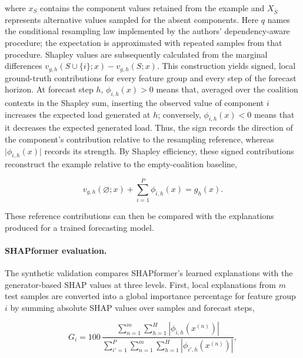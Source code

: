 where $x_S$ contains the component values retained from the example and
$X_{\bar S}$ represents alternative values sampled for the absent components.
Here $q$ names the conditional resampling law implemented by the authors'
dependency-aware procedure; the expectation is approximated with repeated
samples from that procedure.
Shapley values are subsequently calculated from the marginal differences
$v_{g,h}(S\cup\{i\};x)-v_{g,h}(S;x)$. This construction yields signed, local
ground-truth contributions for every feature group and every step of the
forecast horizon. At forecast step $h$, $\phi_{i,h}(x)>0$ means that, averaged
over the coalition contexts in the Shapley sum, inserting the observed value
of component $i$ increases the expected load generated at $h$; conversely,
$\phi_{i,h}(x)<0$ means that it decreases the expected generated load. Thus, the
sign records the direction of the component's contribution relative to the
resampling reference, whereas $\lvert\phi_{i,h}(x)\rvert$ records its strength.
By Shapley efficiency, these signed contributions reconstruct the example
relative to the empty-coalition baseline,

\begin{equation}
    v_{g,h}(\varnothing;x)
    + \sum_{i=1}^{P}\phi_{i,h}(x)
    = g_h(x).
\end{equation}

These reference contributions can then be compared with the explanations
produced for a trained forecasting model.

\paragraph{SHAPformer evaluation.}
The synthetic validation compares SHAPformer's learned explanations with the
generator-based SHAP values at three levels. First, local explanations from
$m$ test samples are converted into a global importance percentage for feature
group $i$ by summing absolute SHAP values over samples and forecast steps,

\begin{equation}
    G_i
    = 100\,
    \frac{\sum_{n=1}^{m}\sum_{h=1}^{H}
    \left|\phi_{i,h}\!\left(x^{(n)}\right)\right|}
    {\sum_{i'=1}^{P}\sum_{n=1}^{m}\sum_{h=1}^{H}
    \left|\phi_{i',h}\!\left(x^{(n)}\right)\right|},
\end{equation}

